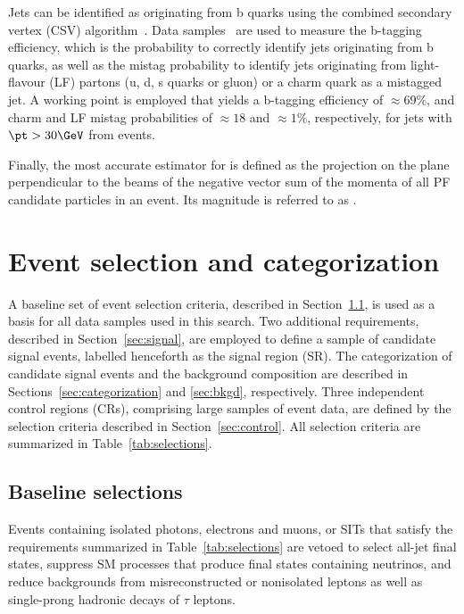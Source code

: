 Jets can be identified as originating from b quarks using the combined
secondary vertex (CSV) algorithm~\cite{Chatrchyan:2012jua}. Data
samples~\cite{CMS-PAS-BTV-15-001} are used to measure the b-tagging
efficiency, which is the probability to correctly identify jets
originating from b quarks, as well as the mistag probability to
identify jets originating from light-flavour (LF) partons (u, d, s
quarks or gluon) or a charm quark as a mistagged jet. A working point
is employed that yields a b-tagging efficiency of ${\approx}69\%$, and
charm and LF mistag probabilities of ${\approx}18$ and ${\approx}1\%$,
respectively, for jets with $\pt > 30\GeV$ from \ttbar events.

Finally, the most accurate estimator for \ptvecmiss is defined as the
projection on the plane perpendicular to the beams of the negative
vector sum of the momenta of all PF candidate particles in an
event. Its magnitude is referred to as \ptmiss.


\section{Event selection and categorization}
\label{sec:selection}

A baseline set of event selection criteria, described in
Section~\ref{sec:baseline}, is used as a basis for all data samples
used in this search. Two additional requirements, described in
Section~\ref{sec:signal}, are employed to define a sample of candidate
signal events, labelled henceforth as the signal region (SR). The
categorization of candidate signal events and the background
composition are described in Sections~\ref{sec:categorization} and
\ref{sec:bkgd}, respectively. Three independent control regions (CRs),
comprising large samples of event data, are defined by the selection
criteria described in Section~\ref{sec:control}. All selection
criteria are summarized in Table~\ref{tab:selections}.

\subsection{Baseline selections}
\label{sec:baseline}

Events containing isolated photons, electrons and muons, or SITs that
satisfy the requirements summarized in Table~\ref{tab:selections} are
vetoed to select all-jet final states, suppress SM processes that
produce final states containing neutrinos, and reduce backgrounds from
misreconstructed or nonisolated leptons as well as single-prong
hadronic decays of $\tau$ leptons.

